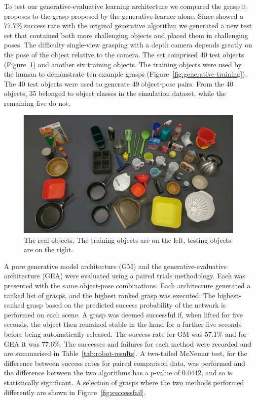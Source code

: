
To test our generative-evaluative learning architecture we compared the grasp it proposes to the grasp proposed by the generative learner alone. Since \citet{kopicki2015ijrr} showed a 77.7\% success rate with the original generative algorithm we generated a new test set that contained both more challenging objects and placed them in challenging poses. The difficulty single-view grasping with a depth camera depends greatly on the pose of the object relative to the camera. The set comprised 40 test objects (Figure~\ref{fig:real-objects}) and another six training objects. The training objects were used by the human to demonstrate ten example grasps (Figure~\ref{fig:generative-training}). The 40 test objects were used to generate 49 object-pose pairs. From the 40 objects, 35 belonged to object classes in the simulation dataset, while the remaining five do not. 

\begin{figure}
  \includegraphics[width=\linewidth]{images/objects.jpg}
  \caption{The real objects. The training objects are on the left, testing objects are on the right.}
  \label{fig:real-objects}
\end{figure}

A pure generative model architecture (GM) and the generative-evaluative architecture (GEA) were evaluated using a paired trials methodology. Each was presented with the same object-pose combinations. Each architecture generated a ranked list of grasps, and the highest ranked grasp was executed. The highest-ranked grasp based on the predicted success probability of the network is performed on each scene. A grasp was deemed successful if, when lifted for five seconds, the object then remained stable in the hand for a further five seconds before being automatically released. The success rate for GM was 57.1\% and for GEA it was 77.6\%. The successes and failures for each method were recorded and are summarised in Table~\ref{tab:robot-results}. A two-tailed McNemar test, for the difference between success rates for paired comparison data, was performed and the difference between the two algorithms has a $p$-value of 0.0442, and so is statistically significant. A selection of grasps where the two methods performed differently are shown in Figure~\ref{fig:successfail}.

